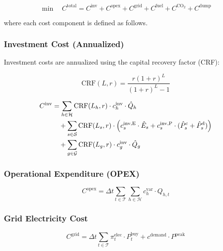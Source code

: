 \documentclass[11pt]{article}
\begin{document}
\begin{equation}
\min \quad C^{\text{total}} = C^{\text{inv}} + C^{\text{opex}} + C^{\text{grid}} + C^{\text{fuel}} + C^{\text{CO}_2} + C^{\text{dump}}
\label{eq:obj_pf}
\end{equation}

where each cost component is defined as follows.

\subsubsection{Investment Cost (Annualized)}

Investment costs are annualized using the capital recovery factor (CRF):

\begin{equation}
\text{CRF}(L, r) = \frac{r(1+r)^L}{(1+r)^L - 1}
\label{eq:crf}
\end{equation}

\begin{align}
C^{\text{inv}} &= \sum_{h \in \mathcal{H}} \text{CRF}(L_h, r) \cdot c_h^{\text{inv}} \cdot \hat{Q}_h \notag \\
&\quad + \sum_{s \in \mathcal{S}} \text{CRF}(L_s, r) \cdot \left( c_s^{\text{inv,E}} \cdot \hat{E}_s + c_s^{\text{inv,P}} \cdot (\hat{P}_s^{\text{c}} + \hat{P}_s^{\text{d}}) \right) \notag \\
&\quad + \sum_{g \in \mathcal{G}} \text{CRF}(L_g, r) \cdot c_g^{\text{inv}} \cdot \hat{Q}_g
\label{eq:cost_inv}
\end{align}

\subsubsection{Operational Expenditure (OPEX)}

\begin{equation}
C^{\text{opex}} = \Delta t \sum_{t \in \mathcal{T}} \sum_{h \in \mathcal{H}} c_h^{\text{var}} \cdot Q_{h,t}
\label{eq:cost_opex}
\end{equation}

\subsubsection{Grid Electricity Cost}

\begin{equation}
C^{\text{grid}} = \Delta t \sum_{t \in \mathcal{T}} \pi_t^{\text{elec}} \cdot P_t^{\text{buy}} + c^{\text{demand}} \cdot P^{\text{peak}}
\label{eq:cost_grid}
\end{equation}
\end{document}
